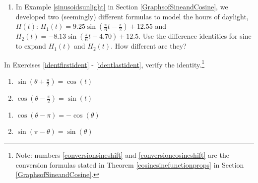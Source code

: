 \begin{enumerate}

\setcounter{enumi}{\value{HW}}

\item  \label{twodaylightfunctions} In Example \ref{sinusoidsunlight} in Section \ref{GraphsofSineandCosine}, we developed two (seemingly) different formulas to model the hours of daylight, $H(t)$:   $H_{1}(t) = 9.25 \sin\left(\frac{\pi}{6} t - \frac{\pi}{2}\right) + 12.55$ and  $H_{2}(t) = -8.13 \sin\left(\frac{\pi}{6} t - 4.70\right)+ 12.5$.  Use the difference identities for sine to expand $H_{1}(t)$ and $H_{2}(t)$.  How different are they?
\setcounter{HW}{\value{enumi}}
\end{enumerate}




In Exercises \ref{identfirstident} - \ref{identlastident}, verify the identity.\footnote{Note: numbers \ref{conversionsineshift} and \ref{conversioncosineshift} are the conversion formulas stated in Theorem \ref{cosinesinefunctionprops} in Section \ref{GraphsofSineandCosine}.}

\begin{multicols}{2}

\begin{enumerate}

\setcounter{enumi}{\value{HW}}

\item  $\sin\left(\theta + \frac{\pi}{2}\right) = \cos(t)$  \label{identfirstident} \label{conversionsineshift}
\item $\cos\left(\theta - \frac{\pi}{2} \right) = \sin(t)$ \label{conversioncosineshift}

\setcounter{HW}{\value{enumi}}

\end{enumerate}

\end{multicols}


\begin{multicols}{2}

\begin{enumerate}

\setcounter{enumi}{\value{HW}}

\item $\cos(\theta - \pi) = -\cos(\theta)$
\item $\sin(\pi - \theta) = \sin(\theta)$

\setcounter{HW}{\value{enumi}}

\end{enumerate}

\end{multicols}

